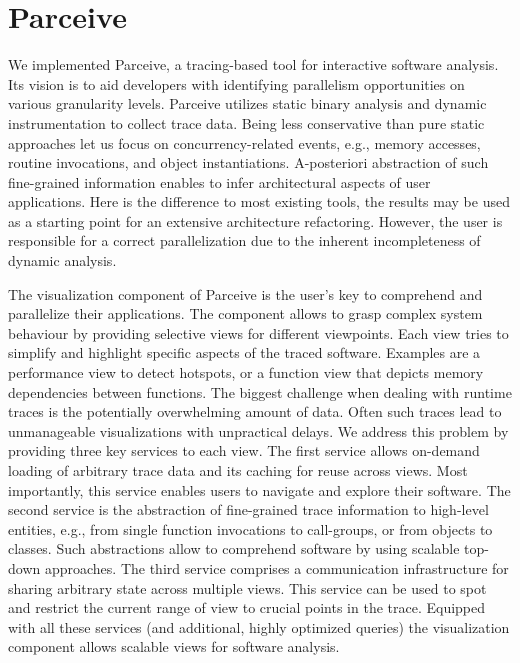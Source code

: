 \documentclass[conference]{IEEEtran}
\begin{document}



\section{Parceive}
\label{sec:parceive}
We implemented Parceive, a tracing-based tool for interactive software
analysis. Its vision is to aid developers with identifying parallelism opportunities
on various granularity levels. Parceive utilizes static binary analysis and dynamic
instrumentation to collect trace data. Being less conservative than pure static
approaches let us focus on concurrency-related events, e.g., memory accesses, routine
invocations, and object instantiations. A-posteriori abstraction of such fine-grained
information enables to infer architectural aspects of user applications. Here is the
difference to most existing tools, the results may be used as a starting point for an
extensive architecture refactoring. However, the user is responsible for a correct
parallelization due to the inherent incompleteness of dynamic analysis.

The visualization component of Parceive is the user's key to comprehend and parallelize
their applications. The component allows to grasp complex system behaviour by providing
selective views for different viewpoints. Each view tries to simplify and
highlight specific aspects of the traced software. Examples are a performance view to
detect hotspots, or a function view that depicts memory dependencies between functions.
The biggest challenge when dealing with runtime traces is the potentially overwhelming
amount of data. Often such traces lead to unmanageable visualizations with unpractical
delays. We address this problem by providing three key services to each view. The first
service allows on-demand loading of arbitrary trace data and its caching for reuse
across views. Most importantly, this service enables users to navigate and explore
their software. The second service is the abstraction of fine-grained trace information
to high-level entities, e.g., from single function invocations to call-groups, or from
objects to classes. Such abstractions allow to comprehend software by using scalable
top-down approaches. The third service comprises a communication infrastructure for
sharing arbitrary state across multiple views. This service can be used to spot and
restrict the current range of view to crucial points in the trace.  Equipped with all
these services (and additional, highly optimized queries) the visualization component
allows scalable views for software analysis.
\end{document}
